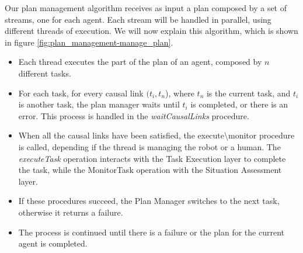 Our plan management algorithm receives as input a plan composed by a set of streams, one for each agent. Each stream will be handled in parallel, using different threads of execution. We will now explain this algorithm, which is shown in figure \ref{fig:plan_management-manage_plan}.
\begin{itemize}
  \item Each thread executes the part of the plan of an agent, composed by $n$ different tasks.
  \item For each task, for every causal link $(t_i,t_n$), where $t_n$ is the current task, and $t_i$ is another task, the plan manager waits until $t_i$ is completed, or there is an error. This process is handled in the \textit{waitCausalLinks} procedure.
  \item When all the causal links have been satisfied, the execute\textbackslash monitor procedure is called, depending if the thread is managing the robot or a human. The \textit{executeTask} operation interacts with the Task Execution layer to complete the task, while the MonitorTask operation with the Situation Assessment layer.
  \item If these procedures succeed, the Plan Manager switches to the next task, otherwise it returns a failure.
  \item The process is continued until there is a failure or the plan for the current agent is completed.
\end{itemize} 

